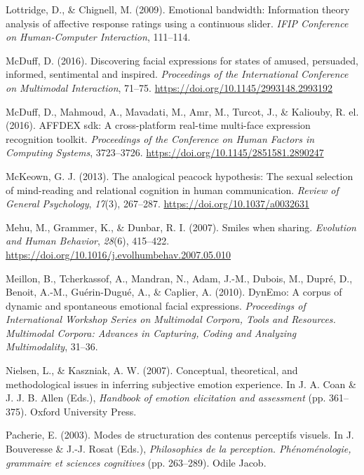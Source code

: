 \documentclass[
  english,
  doc]{apa7}
\newlength{\cslhangindent}
\newenvironment{cslreferences}%
  {\setlength{\parindent}{0pt}%
  \everypar{\setlength{\hangindent}{\cslhangindent}}\ignorespaces}%
  {\par}
\begin{document}
\begin{cslreferences}
\leavevmode\hypertarget{ref-lottridge2009emotional}{}%
Lottridge, D., \& Chignell, M. (2009). Emotional bandwidth: Information theory analysis of affective response ratings using a continuous slider. \emph{IFIP Conference on Human-Computer Interaction}, 111--114.

\leavevmode\hypertarget{ref-mcduff2016discovering}{}%
McDuff, D. (2016). Discovering facial expressions for states of amused, persuaded, informed, sentimental and inspired. \emph{Proceedings of the International Conference on Multimodal Interaction}, 71--75. \url{https://doi.org/10.1145/2993148.2993192}

\leavevmode\hypertarget{ref-mcduff2016affdex}{}%
McDuff, D., Mahmoud, A., Mavadati, M., Amr, M., Turcot, J., \& Kaliouby, R. el. (2016). AFFDEX sdk: A cross-platform real-time multi-face expression recognition toolkit. \emph{Proceedings of the Conference on Human Factors in Computing Systems}, 3723--3726. \url{https://doi.org/10.1145/2851581.2890247}

\leavevmode\hypertarget{ref-mckeown2013analogical}{}%
McKeown, G. J. (2013). The analogical peacock hypothesis: The sexual selection of mind-reading and relational cognition in human communication. \emph{Review of General Psychology}, \emph{17}(3), 267--287. \url{https://doi.org/10.1037/a0032631}

\leavevmode\hypertarget{ref-mehu2007smiles}{}%
Mehu, M., Grammer, K., \& Dunbar, R. I. (2007). Smiles when sharing. \emph{Evolution and Human Behavior}, \emph{28}(6), 415--422. \url{https://doi.org/10.1016/j.evolhumbehav.2007.05.010}

\leavevmode\hypertarget{ref-meillon2010dynemo}{}%
Meillon, B., Tcherkassof, A., Mandran, N., Adam, J.-M., Dubois, M., Dupré, D., Benoit, A.-M., Guérin-Dugué, A., \& Caplier, A. (2010). DynEmo: A corpus of dynamic and spontaneous emotional facial expressions. \emph{Proceedings of International Workshop Series on Multimodal Corpora, Tools and Resources. Multimodal Corpora: Advances in Capturing, Coding and Analyzing Multimodality}, 31--36.

\leavevmode\hypertarget{ref-nielsen2007conceptual}{}%
Nielsen, L., \& Kaszniak, A. W. (2007). Conceptual, theoretical, and methodological issues in inferring subjective emotion experience. In J. A. Coan \& J. J. B. Allen (Eds.), \emph{Handbook of emotion elicitation and assessment} (pp. 361--375). Oxford University Press.

\leavevmode\hypertarget{ref-pacherie2003modes}{}%
Pacherie, E. (2003). Modes de structuration des contenus perceptifs visuels. In J. Bouveresse \& J.-J. Rosat (Eds.), \emph{Philosophies de la perception. Phénoménologie, grammaire et sciences cognitives} (pp. 263--289). Odile Jacob.


\end{cslreferences}
\end{document}
